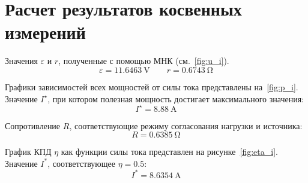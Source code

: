 \section{Расчет результатов косвенных измерений}
Значения $\varepsilon$ и $r$, полученные с помощью МНК (см.~\cref{fig:u_i}).
\[
	\varepsilon = \SI{11.6463}{\volt}
	\qquad
	r = \SI{0.6743}{\ohm}
\]

Графики зависимостей всех мощностей от силы тока представлены на~\cref{fig:p_i}.
Значение $I^\star$, при котором полезная мощность достигает максимального значения:
\[
	I^\star = \SI{8.88}{\ampere}
\]

Сопротивление $R$, соответствующие режиму согласования нагрузки и источника:
\[
	R = \SI{0.6385}{\ohm}
\]

График КПД $\eta$ как функции силы тока представлен на рисунке~\cref{fig:eta_i}.
Значение $I^*$, соответствующее $\eta = 0.5$:
\[
	I^* = \SI{8.6354}{\ampere}
\]
